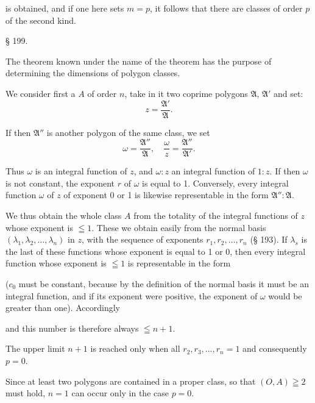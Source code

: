 is obtained, and if one here sets $m=p$, it follows that there are
classes of order $p$ of the second kind.

\begin{center}
§ 199. 
\end{center}

The theorem known under the name of the  theorem
has the purpose of determining the dimensions of polygon
 classes.

We consider first a 
 $A$ of order $n$, take in it two coprime
polygons $\mathfrak{A}$, $\mathfrak{A}'$ and set:
\[
z = \frac{\mathfrak{A}'}{\mathfrak{A}}.
\]

If then $\mathfrak{A}''$ is another polygon of the same class, we
set
\[
\omega = \frac{\mathfrak{A}''}{\mathfrak{A}},\quad \frac{\omega}{z} = \frac{\mathfrak{A}''}{\mathfrak{A}'}.
\]

Thus $\omega$ is an integral function of $z$, and $\omega:z$ an
integral function of $1:z$. If then $\omega$ is not constant, the
exponent $r$ of $\omega$ is equal to 1. Conversely, every integral
function $\omega$ of $z$ of exponent 0 or 1 is likewise representable in the form
$\mathfrak{A}'':\mathfrak{A}$.

We thus obtain the whole class $A$ from the totality
of the integral functions of $z$ whose exponent is $\leqq 1$. These
we obtain easily from the normal basis $(\lambda_1, \lambda_2, \ldots, \lambda_n)$ in $z$,
with the sequence of exponents $r_1, r_2, \ldots, r_n$ (§ 193). If $\lambda_s$ is the
last of these functions whose exponent is equal to 1 or 0, then
every integral function whose exponent is $\leqq 1$ is representable in the form


($c_0$ must be constant, because by the definition
of the normal basis it must be an integral function, and if its
exponent were positive, the exponent of $\omega$ would be greater than
one). Accordingly


and this number is therefore always $\leqq n + 1$.

The upper limit $n+1$ is reached only when all
$r_2, r_3, \ldots, r_n = 1$ and consequently $p = 0$.

Since at least two polygons are contained in a proper class,
so that $(O, A) \geqq 2$ must hold, $n = 1$ can occur only
in the case $p = 0$.

